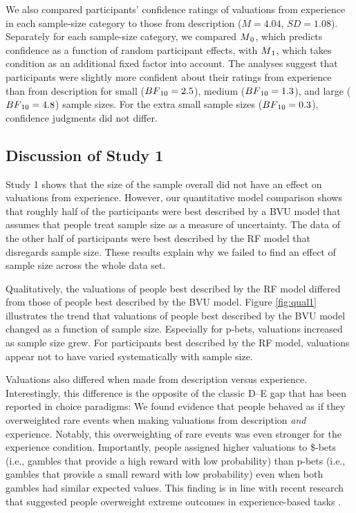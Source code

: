 \documentclass[a4paper,man, natbib]{apa6} %
\begin{document}
We also compared participants' confidence ratings of valuations from experience in each sample-size category to those from description ($M = 4.04$, $SD = 1.08$). Separately for each sample-size category, we compared $M\textsubscript{0}$, which predicts confidence as a function of random participant effects, with $M\textsubscript{1}$, which takes condition as an additional fixed factor into account. The analyses suggest that participants were slightly more confident about their ratings from experience than from description for small ($BF\textsubscript{10} = 2.5$), medium ($BF\textsubscript{10} = 1.3$), and large ($BF\textsubscript{10} = 4.8$) sample sizes. For the extra small sample sizes ($BF\textsubscript{10} = 0.3$), confidence judgments did not differ. 


\subsection{Discussion of Study 1}

Study 1 shows that the size of the sample overall did not have an effect on valuations from experience. However, our quantitative model comparison shows that roughly half of the participants were best described by a BVU model that assumes that people treat sample size as a measure of uncertainty. The data of the other half of participants were best described by the RF model that disregards sample size. These results explain why we failed to find an effect of sample size across the whole data set. 

Qualitatively, the valuations of people best described by the RF model differed from those of people best described by the BVU model. Figure \ref{fig:qual1} illustrates the trend that valuations of people best described by the BVU model changed as a function of sample size. Especially for p-bets, valuations increased as sample size grew. %
For participants best described by the RF model, valuations appear not to have varied systematically with sample size. 

Valuations also differed when made from description versus experience. Interestingly, this difference is the opposite of the classic D--E gap that has been reported in choice paradigms: We found evidence that people behaved as if they overweighted rare events when making valuations from description \textit{and} experience. Notably, this overweighting of rare events was even stronger for the experience condition. Importantly, people assigned higher valuations to \$-bets (i.e., gambles that provide a high reward with low probability) than p-bets (i.e., gambles that provide a small reward with low probability) even when both gambles had similar expected values. This finding is in line with recent research that suggested people overweight extreme outcomes in experience-based tasks \citep{Ludvig2017}.
\end{document}
